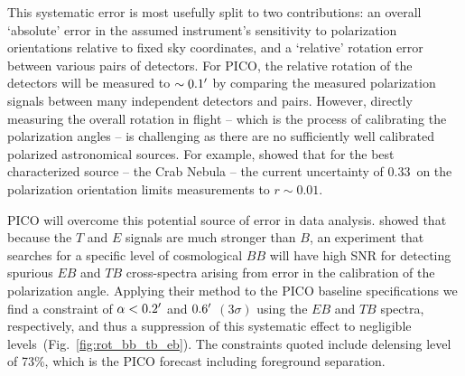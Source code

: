 \documentclass[PICOReport.tex]{subfiles}
\begin{document}
This systematic error is most usefully split to two contributions: an overall `absolute' error in the assumed instrument's sensitivity to polarization orientations relative to fixed sky coordinates, and a `relative' rotation error between various pairs of detectors. For PICO, the relative rotation of the detectors will be measured to $\sim 0.1'$ by comparing the measured polarization signals between many independent detectors and pairs. However, directly measuring the overall rotation in flight -- which is the process of calibrating the polarization angles --  is challenging as there are no sufficiently well calibrated polarized astronomical sources. For example, \citet{Aumont+2018} showed that for the best characterized source -- the Crab Nebula -- the current uncertainty of $0.33$\degree\ on the polarization orientation limits measurements to $r \sim 0.01$. 

PICO will overcome this potential source of error 
in data analysis. \citet{yadav2010} showed that because the $T$ and $E$ signals are much stronger than $B$, an experiment that searches for a specific level of cosmological $BB$ will have high \ac{SNR} for detecting spurious $EB$ and $TB$ cross-spectra arising from error in the calibration of the polarization angle. Applying their method to the PICO baseline specifications we find a constraint of $\alpha<0.2'$ and $0.6'$ $(3\sigma)$ using the $EB$ and $TB$ spectra, respectively, and thus a suppression of this systematic effect to negligible levels~(Fig.~\ref{fig:rot_bb_tb_eb}). The constraints quoted include delensing level of 73\%, which is the PICO forecast including foreground separation. 



\end{document}
